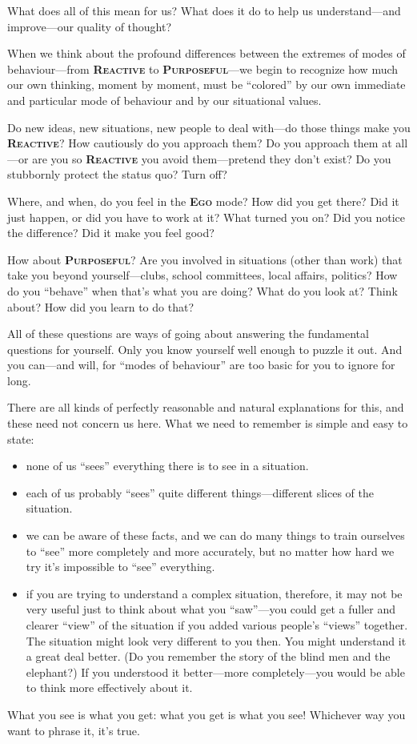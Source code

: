 \documentclass[a5paper]{article}
\begin{document}
What does all of this mean for us?
What does it do to help us understand---and improve---our quality of thought?

When we think about the profound differences between the extremes of modes of behaviour---from \textbf{\scshape Reactive} to \textbf{\scshape Purposeful}---we begin to recognize how much our own thinking, moment by moment, must be ``colored'' by our own immediate and particular mode of behaviour and by our situational values.

Do new ideas, new situations, new people to deal with---do those things make you \textbf{\scshape Reactive}?
How cautiously do you approach them?
Do you approach them at all---or are you so \textbf{\scshape Reactive} you avoid them---pretend they don't exist?
Do you stubbornly protect the status quo?
Turn off?

Where, and when, do you feel in the \textbf{\scshape Ego} mode?
How did you get there?
Did it just happen, or did you have to work at it?
What turned you on?
Did you notice the difference?
Did it make you feel good?

How about \textbf{\scshape Purposeful}?
Are you involved in situations (other than work) that take you beyond yourself---clubs, school committees, local affairs, politics?
How do you ``behave'' when that's what you are doing?
What do you look at?
Think about?
How did you learn to do that?

All of these questions are ways of going about answering the fundamental questions for yourself.
Only you know yourself well enough to puzzle it out.
And you can---and will, for ``modes of behaviour'' are too basic for you to ignore for long.

There are all kinds of perfectly reasonable and natural explanations for this, and these need not concern us here.
What we need to remember is simple and easy to state:
\begin{itemize}
  \item none of us ``sees'' everything there is to see in a situation.
  \item each of us probably ``sees'' quite different things---different slices of the situation.
  \item we can be aware of these facts, and we can do many things to train ourselves to ``see'' more completely and more accurately, but no matter how hard we try it's impossible to ``see'' everything.
  \item if you are trying to understand a complex situation, therefore, it may not be very useful just to think about what you ``saw''---you could get a fuller and clearer ``view'' of the situation if you added various people's ``views'' together.
    The situation might look very different to you then.
    You might understand it a great deal better.
    (Do you remember the story of the blind men and the elephant?)
    If you understood it better---more completely---you would be able to think more effectively about it.
\end{itemize}
What you see is what you get: what you get is what you see!
Whichever way you want to phrase it, it's true.
\end{document}
